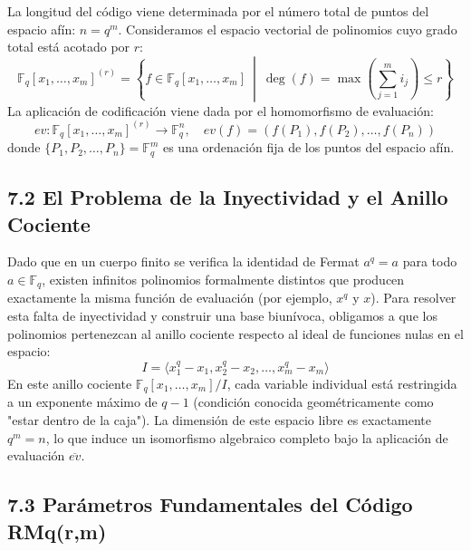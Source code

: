 \documentclass{article}
\begin{document}
La longitud del código viene determinada por el número total de puntos del espacio afín: $n = q^m$. Consideramos el espacio vectorial de polinomios cuyo grado total está acotado por $r$:
\[
\mathbb{F}_{q}[x_{1},\dots,x_{m}]^{(r)} = \left\{f \in \mathbb{F}_{q}[x_{1},\dots,x_{m}] \ \middle| \ \operatorname{deg}(f) = \max \left(\sum_{j=1}^m i_j\right) \le r\right\}
\]
La aplicación de codificación viene dada por el homomorfismo de evaluación:
\[
ev: \mathbb{F}_{q}[x_{1},\dots,x_{m}]^{(r)} \longrightarrow \mathbb{F}_{q}^n, \quad ev(f) = (f(P_1), f(P_2), \dots, f(P_n))
\]
donde $\{P_1, P_2, \dots, P_n\} = \mathbb{F}_q^m$ es una ordenación fija de los puntos del espacio afín.

\subsection{7.2 El Problema de la Inyectividad y el Anillo Cociente}

Dado que en un cuerpo finito se verifica la identidad de Fermat $a^q = a$ para todo $a \in \mathbb{F}_q$, existen infinitos polinomios formalmente distintos que producen exactamente la misma función de evaluación (por ejemplo, $x^q$ y $x$). Para resolver esta falta de inyectividad y construir una base biunívoca, obligamos a que los polinomios pertenezcan al anillo cociente respecto al ideal de funciones nulas en el espacio:
\[
I = \langle x_1^q - x_1, x_2^q - x_2, \dots, x_m^q - x_m \rangle
\]
En este anillo cociente $\mathbb{F}_q[x_1, \dots, x_m]/I$, cada variable individual está restringida a un exponente máximo de $q-1$ (condición conocida geométricamente como "estar dentro de la caja"). La dimensión de este espacio libre es exactamente $q^m = n$, lo que induce un isomorfismo algebraico completo bajo la aplicación de evaluación $\overline{ev}$.

\subsection{7.3 Parámetros Fundamentales del Código RMq(r,m)}
\end{document}
